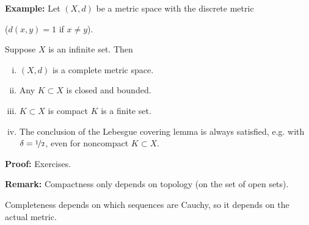 \documentclass[10pt,aspectratio=169]{beamer}
\begin{document}
\begin{frame}

\textbf{Example:}
Let $(X,d)$ be a metric space with the discrete metric

($d(x,y) = 1$ if $x \not= y$).

\pause
Suppose $X$ is an infinite set.  Then
\begin{enumerate}[(i)]
\item
\pause
$(X,d)$ is a complete metric space.
\item
\pause
Any $K \subset X$ is closed and bounded.
\item
\pause
$K \subset X$ is compact \wiffif $K$ is a finite set.
\item
\pause
The conclusion of the Lebesgue covering lemma is always satisfied,
e.g. with $\delta = \nicefrac{1}{2}$,
even for noncompact $K \subset X$.
\end{enumerate}

\pause
\textbf{Proof:} Exercises.

\pause
\medskip

\textbf{Remark:}
Compactness only depends on topology (on the set of open sets).

\pause
\medskip

Completeness depends on which sequences are Cauchy, so
it depends on the actual metric.

\end{frame}
\end{document}
